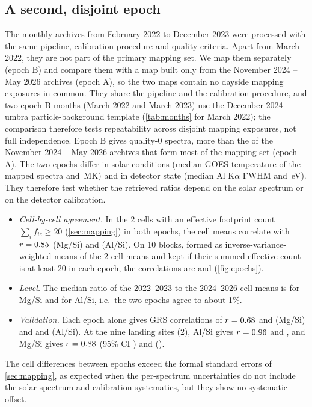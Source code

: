 \subsection{A second, disjoint epoch}\label{sec:epochs}
The \EpBNMonths{} monthly archives from February 2022 to December 2023 were processed with the same pipeline, calibration procedure and quality criteria. Apart from March 2022, they are not part of the primary mapping set. We map them separately (epoch B) and compare them with a map built only from the November 2024 -- May 2026 archives (epoch A), so the two maps contain no dayside mapping exposures in common. They share the pipeline and the calibration procedure, and two epoch-B months (March 2022 and March 2023) use the December 2024 umbra particle-background template (\cref{tab:months} for March 2022); the comparison therefore tests repeatability across disjoint mapping exposures, not full independence. Epoch B gives \EpBNFp{} quality-0 spectra, more than the \EpANFp{} of the November 2024 -- May 2026 archives that form most of the mapping set (epoch A). The two epochs differ in solar conditions (median GOES temperature of the mapped spectra \EpBTmed{} and \EpATmed\,MK) and in detector state (median Al K$\alpha$ FWHM \EpBFwhm{} and \EpAFwhm\,eV). They therefore test whether the retrieved ratios depend on the solar spectrum or on the detector calibration.
\begin{itemize}
\item \emph{Cell-by-cell agreement.} In the \EpMgTwoN{} 2\textdegree{} cells with an effective footprint count $\sum_i f_{ic}\ge20$ (\cref{sec:mapping}) in both epochs, the cell means correlate with $r=0.85$ (Mg/Si) and \EpAlTwoR{} (Al/Si). On 10\textdegree{} blocks, formed as inverse-variance-weighted means of the 2\textdegree{} cell means and kept if their summed effective count is at least 20 in each epoch, the correlations are \EpMgTenR{} and \EpAlTenR{} (\cref{fig:epochs}).
\item \emph{Level.} The median ratio of the 2022--2023 to the 2024--2026 cell means is \EpMgTwoRatio{} for Mg/Si and \EpAlTwoRatio{} for Al/Si, i.e.\ the two epochs agree to about 1\%.
\item \emph{Validation.} Each epoch alone gives GRS correlations of $r=0.68$ and \EpBGrsMgR{} (Mg/Si) and \EpAGrsAlR{} and \EpBGrsAlR{} (Al/Si). At the nine landing sites (2\textdegree), Al/Si gives $r=0.96$ and \EpBSiteAlR, and Mg/Si gives $r=0.88$ (95\% CI \EpASiteMgCI) and \EpBSiteMgR{} (\EpBSiteMgCI).
\end{itemize}
The cell differences between epochs exceed the formal standard errors of \cref{sec:mapping}, as expected when the per-spectrum uncertainties do not include the solar-spectrum and calibration systematics, but they show no systematic offset.

